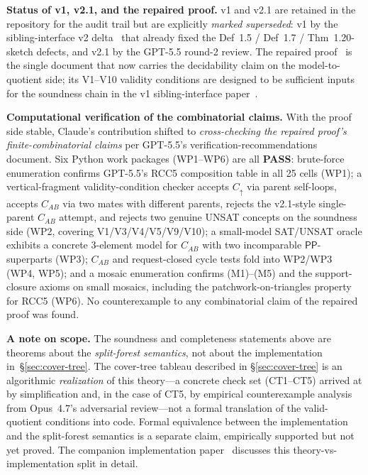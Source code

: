 \documentclass[
]{ceurart}
\theoremstyle{definition}
\newcommand{\PP}{\ensuremath{\mathsf{PP}}}
\begin{document}
\medskip\noindent\textbf{Status of v1, v2.1, and the repaired
proof.}  v1 and v2.1 are retained in the repository for the audit
trail but are explicitly \emph{marked superseded}: v1 by the
sibling-interface v2 delta~\cite{SiblingInterfaceV2} that already
fixed the Def~1.5 / Def~1.7 / Thm~1.20-sketch defects, and v2.1 by
the GPT-5.5 round-2 review.  The repaired proof~\cite{GPT55Repaired}
is the single document that now carries the decidability claim on
the model-to-quotient side; its V1--V10 validity conditions are
designed to be sufficient inputs for the soundness chain in the v1
sibling-interface paper~\cite{SiblingCompleted}.

\medskip\noindent\textbf{Computational verification of the
combinatorial claims.}
With the proof side stable, Claude's contribution shifted to
\emph{cross-checking the repaired proof's finite-combinatorial
claims} per GPT-5.5's verification-recommendations document.  Six
Python work packages (WP1--WP6) are all \textbf{PASS}: brute-force
enumeration confirms GPT-5.5's RCC5 composition table in all 25
cells (WP1); a vertical-fragment validity-condition checker accepts
$C_\uparrow$ via parent self-loops, accepts $C_{AB}$ via two mates
with different parents, rejects the v2.1-style single-parent
$C_{AB}$ attempt, and rejects two genuine UNSAT concepts on the
soundness side (WP2, covering V1/V3/V4/V5/V9/V10); a small-model
SAT/UNSAT oracle exhibits a concrete 3-element model for $C_{AB}$
with two incomparable $\PP$-superparts (WP3); $C_{AB}$ and
request-closed cycle tests fold into WP2/WP3 (WP4, WP5); and a
mosaic enumeration confirms (M1)--(M5) and the support-closure
axioms on small mosaics, including the patchwork-on-triangles
property for RCC5 (WP6).  No counterexample to any combinatorial
claim of the repaired proof was found.

\medskip\noindent\textbf{A note on scope.}
The soundness and completeness statements above are theorems
about the \emph{split-forest semantics}, not about the
implementation in~\S\ref{sec:cover-tree}.  The cover-tree
tableau described in \S\ref{sec:cover-tree} is an algorithmic
\emph{realization} of this theory---a concrete check set
(CT1--CT5) arrived at by simplification and, in the case of CT5,
by empirical counterexample analysis from Opus~4.7's adversarial
review---not a formal translation of the valid-quotient conditions
into code.  Formal equivalence between the implementation and the
split-forest semantics is a separate claim, empirically supported
but not yet proved.  The companion implementation
paper~\cite{CoverTreeImpl} discusses this theory-vs-implementation
split in detail.
\end{document}
